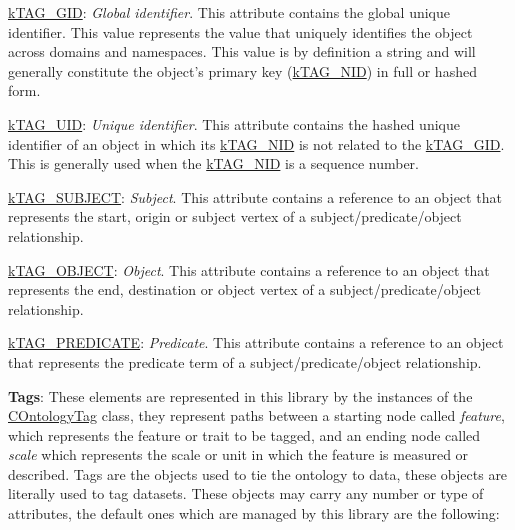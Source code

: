 {\begin{DoxyItemize}
\begin{DoxyItemize}
\item {\ttfamily \hyperlink{}{k\-T\-A\-G\-\_\-\-G\-I\-D}}\-: {\itshape Global identifier}. This attribute contains the global unique identifier. This value represents the value that uniquely identifies the object across domains and namespaces. This value is by definition a string and will generally constitute the object's primary key (\hyperlink{}{k\-T\-A\-G\-\_\-\-N\-I\-D}) in full or hashed form. 
\item {\ttfamily \hyperlink{}{k\-T\-A\-G\-\_\-\-U\-I\-D}}\-: {\itshape Unique identifier}. This attribute contains the hashed unique identifier of an object in which its \hyperlink{}{k\-T\-A\-G\-\_\-\-N\-I\-D} is not related to the \hyperlink{}{k\-T\-A\-G\-\_\-\-G\-I\-D}. This is generally used when the \hyperlink{}{k\-T\-A\-G\-\_\-\-N\-I\-D} is a sequence number. 
\item {\ttfamily \hyperlink{}{k\-T\-A\-G\-\_\-\-S\-U\-B\-J\-E\-C\-T}}\-: {\itshape Subject}. This attribute contains a reference to an object that represents the start, origin or subject vertex of a {\ttfamily subject}/{\ttfamily predicate}/{\ttfamily object} relationship. 
\item {\ttfamily \hyperlink{}{k\-T\-A\-G\-\_\-\-O\-B\-J\-E\-C\-T}}\-: {\itshape Object}. This attribute contains a reference to an object that represents the end, destination or object vertex of a {\ttfamily subject}/{\ttfamily predicate}/{\ttfamily object} relationship. 
\item {\ttfamily \hyperlink{}{k\-T\-A\-G\-\_\-\-P\-R\-E\-D\-I\-C\-A\-T\-E}}\-: {\itshape Predicate}. This attribute contains a reference to an object that represents the predicate term of a {\ttfamily subject}/{\ttfamily predicate}/{\ttfamily object} relationship. 
\end{DoxyItemize}
\item {\bfseries Tags}\-: These elements are represented in this library by the instances of the \hyperlink{class_c_ontology_tag}{C\-Ontology\-Tag} class, they represent paths between a starting node called {\itshape feature}, which represents the feature or trait to be tagged, and an ending node called {\itshape scale} which represents the scale or unit in which the feature is measured or described. Tags are the objects used to tie the ontology to data, these objects are literally used to tag datasets. These objects may carry any number or type of attributes, the default ones which are managed by this library are the following\-: 
\begin{DoxyItemize}

\end{DoxyItemize}
\end{DoxyItemize}}
